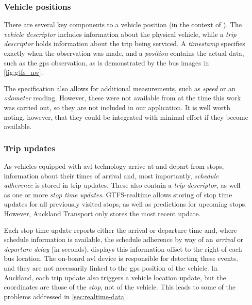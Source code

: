 \subsubsection{Vehicle positions}
\label{sec:gtfs_rt_vehicle}

There are several key components to a vehicle position (in the context of \GTFS{}). The \emph{vehicle descriptor} includes information about the physical vehicle, while a \emph{trip descriptor} holds information about the trip being serviced. A \emph{timestamp} specifies exactly when the observation was made, and a \emph{position} contains the actual data, such as the \gls{gps} observation, as is demonstrated by the bus images in \cref{fig:gtfs_nw}.


The specification also allows for additional measurements, such as \emph{speed} or an \emph{odometer} reading. However, these were not available from \AT{} at the time this work was carried out, so they are not included in our application. It is well worth noting, however, that they could be integrated with minimal effort if they become available.


\subsubsection{Trip updates}
\label{sec:gtfs_rt_trip}

As vehicles equipped with \gls{avl} technology arrive at and depart from stops, information about their times of arrival and, most importantly, \emph{schedule adherence} is stored in trip updates. These also contain a \emph{trip descriptor}, as well as one or more \emph{stop time updates}. GTFS-realtime allows storing of stop time updates for all previously visited stops, as well as predictions for upcoming stops. However, Auckland Transport only stores the most recent update.


Each stop time update reports either the arrival or departure time and, where schedule information is available, the schedule adherence by way of an \emph{arrival} or \emph{departure delay} (in seconds).  displays this information offset to the right of each bus location. The on-board \gls{avl} device is responsible for detecting these events, and they are not necessarily linked to the \gls{gps} position of the vehicle. In Auckland, each trip update also triggers a vehicle location update, but the coordinates are those of the \emph{stop}, not of the vehicle. This leads to some of the problems addressed in \cref{sec:realtime-data}.


